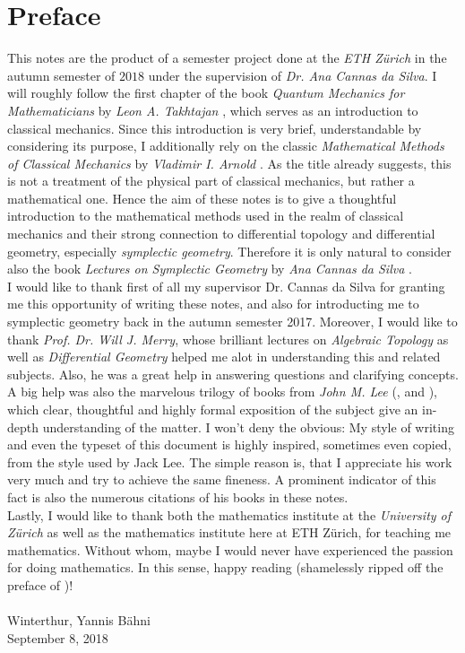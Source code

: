 \chapter*{Preface}
This notes are the product of a semester project done at the \emph{ETH Z\"urich} in the autumn semester of $2018$ under the supervision of \emph{Dr. Ana Cannas da Silva}. I will roughly follow the first chapter of the book \emph{Quantum Mechanics for Mathematicians} by \emph{Leon A. Takhtajan} \cite{takhtajan:QM:2008}, which serves as an introduction to classical mechanics. Since this introduction is very brief, understandable by considering its purpose, I additionally rely on the classic \emph{Mathematical Methods of Classical Mechanics} by \emph{Vladimir I. Arnold} \cite{arnold:CM:1989}. As the title already suggests, this is not a treatment of the physical part of classical mechanics, but rather a mathematical one. Hence the aim of these notes is to give a thoughtful introduction to the mathematical methods used in the realm of classical mechanics and their strong connection to differential topology and differential geometry, especially \emph{symplectic geometry}. Therefore it is only natural to consider also the book \emph{Lectures on Symplectic Geometry} by \emph{Ana Cannas da Silva} \cite{silva:SG:2008}.\\
I would like to thank first of all my supervisor Dr. Cannas da Silva for granting me this opportunity of writing these notes, and also for introducting me to symplectic geometry back in the autumn semester 2017. Moreover, I would like to thank \emph{Prof. Dr. Will J. Merry}, whose brilliant lectures on \emph{Algebraic Topology} as well as \emph{Differential Geometry} helped me alot in understanding this and related subjects. Also, he was a great help in answering questions and clarifying concepts. A big help was also the marvelous trilogy of books from \emph{John M. Lee} (\cite{lee:topological_manifolds:2011}, \cite{lee:smooth_manifolds:2013} and \cite{lee:Riemannian_manifolds:1997}), which clear, thoughtful and highly formal exposition of the subject give an in-depth understanding of the matter. I won't deny the obvious: My style of writing and even the typeset of this document is highly inspired, sometimes even copied, from the style used by Jack Lee. The simple reason is, that I appreciate his work very much and try to achieve the same fineness. A prominent indicator of this fact is also the numerous citations of his books in these notes.\\
Lastly, I would like to thank both the mathematics institute at the \emph{University of Z\"urich} as well as the mathematics institute here at ETH Z\"urich, for teaching me mathematics. Without whom, maybe I would never have experienced the passion for doing mathematics. In this sense, happy reading (shamelessly ripped off the preface of \cite{lee:smooth_manifolds:2013})!\\ 
\newline\\
\noindent Winterthur, \hfill Yannis B\"ahni\\
September 8, 2018

